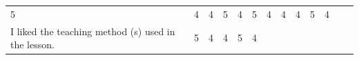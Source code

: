 \documentclass[paper=a4,justified,a4paper]{tufte-handout}
\begin{document}
\begin{longtable}[]{@{}lllllllllllll@{}}
\begin{minipage}[t]{0.04\columnwidth}
5\strut
\end{minipage} & \begin{minipage}[t]{0.04\columnwidth}\raggedright
4\strut
\end{minipage} & \begin{minipage}[t]{0.04\columnwidth}\raggedright
4\strut
\end{minipage} & \begin{minipage}[t]{0.04\columnwidth}\raggedright
5\strut
\end{minipage} & \begin{minipage}[t]{0.04\columnwidth}\raggedright
4\strut
\end{minipage} & \begin{minipage}[t]{0.04\columnwidth}\raggedright
5\strut
\end{minipage} & \begin{minipage}[t]{0.04\columnwidth}\raggedright
4\strut
\end{minipage} & \begin{minipage}[t]{0.07\columnwidth}\raggedright
4\strut
\end{minipage} & \begin{minipage}[t]{0.07\columnwidth}\raggedright
4\strut
\end{minipage} & \begin{minipage}[t]{0.07\columnwidth}\raggedright
5\strut
\end{minipage} & \begin{minipage}[t]{0.07\columnwidth}\raggedright
4\strut
\end{minipage}\tabularnewline
\begin{minipage}[t]{0.07\columnwidth}\raggedright
\scriptsize I liked the teaching method (s) used in the lesson.\strut
\end{minipage} & \begin{minipage}[t]{0.04\columnwidth}\raggedright
5\strut
\end{minipage} & \begin{minipage}[t]{0.04\columnwidth}\raggedright
4\strut
\end{minipage} & \begin{minipage}[t]{0.04\columnwidth}\raggedright
4\strut
\end{minipage} & \begin{minipage}[t]{0.04\columnwidth}\raggedright
5\strut
\end{minipage} & \begin{minipage}[t]{0.04\columnwidth}\raggedright
4\strut
\end{minipage} & \begin{minipage}[t]{0.04\columnwidth}\raggedright

\end{minipage}
\end{longtable}
\end{document}
